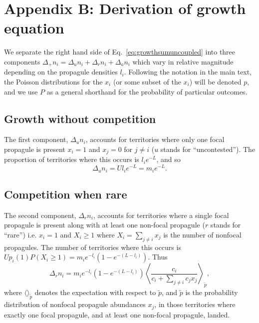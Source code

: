 \documentclass[12pt]{article}
\begin{document}
\section*{Appendix B: Derivation of growth equation}

We separate the right hand side of Eq.~\eqref{eq:growthsumuncoupled} into three components $\Delta_+ n_i = \Delta_u n_i+\Delta_r n_i+\Delta_a n_i$ which vary in relative magnitude depending on the propagule densities $l_i$. Following the notation in the main text, the Poisson distributions for the $x_i$ (or some subset of the $x_i$) will be denoted $p$, and we use $P$ as a general shorthand for the probability of particular outcomes.

\subsection*{Growth without competition}

The first component, $\Delta_u n_i$, accounts for territories where only one focal propagule is present $x_i=1$ and $x_j=0$ for $j\neq i$ ($u$ stands for ``uncontested''). The proportion of territories where this occurs is $l_i e^{-L}$, and so 
\begin{equation}
\Delta_u n_i=Ul_i e^{-L}=m_i e^{-L}.
\end{equation}

\subsection*{Competition when rare}

The second component, $\Delta_r n_i$, accounts for territories where a single focal propagule is present along with at least one non-focal propagule ($r$ stands for ``rare'') i.e. $x_i=1$ and $X_i\geq 1$ where $X_i=\sum_{j\neq i} x_j$ is the number of nonfocal propagules. The number of territories where this occurs is $Up_i(1)P(X_i\geq 1)=m_i e^{-l_i}(1-e^{-(L-l_i)})$. Thus 
\begin{equation}
\Delta_r n_i = m_i e^{-l_i}(1-e^{-(L-l_i)})\left\langle  \frac{c_i}{c_i +\sum_{j\neq i} c_j x_j } \right\rangle_{\tilde{p}},  \label{eq:deltr}
\end{equation}
where $\langle \rangle_{\tilde{p}}$ denotes the expectation with respect to $\tilde{p}$, and $\tilde{p}$ is the probability distribution of nonfocal propagule abundances $x_j$, in those territories where exactly one focal propagule, and at least one non-focal propagule, landed. 
\end{document}
